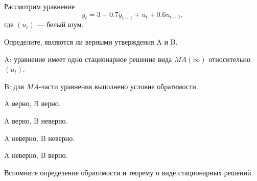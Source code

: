 
\begin{question}
Рассмотрим уравнение
\[
y_t = 3 + 0.7 y_{t-1} + u_t + 0.6 u_{t-1},
\]
где \((u_t)\) --- белый шум.

Определите, являются ли верными утверждения A и B.

A: уравнение имеет одно стационарное решение вида \(MA(\infty)\) относительно \((u_t)\).

B: для \(MA\)-части уравнения выполнено условие обратимости.
\begin{answerlist}
  \item A верно, B верно.
  \item A верно, B неверно.
  \item A неверно, B неверно.
  \item A неверно, B верно.
\end{answerlist}
\end{question}

\begin{solution}
Вспомните определение обратимости и теорему о виде стационарных решений.
\end{solution}

